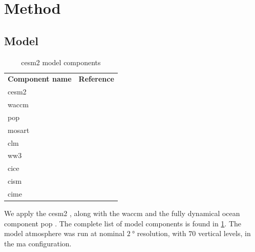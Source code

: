 \documentclass{ametsocV5}
\begin{document}
\section{Method}

\subsection{Model}

\begin{table}
  \centering

  \caption{\acl*{cesm2} model components}\label{tab:cesm-components}%
  \begin{center}
    \begin{tabular}[c]{ll}
      \multicolumn{1}{c}{\textbf{Component name}} &
      \multicolumn{1}{c}{\textbf{Reference}}                                              \\
      \acl*{cesm2}                                & \citet{danabasoglu2020}               \\
      \acl*{waccm}                                & \citet{gettleman2019}                 \\
      \acl*{pop}                                  & \citet{smith2010, danabasoglu2020}    \\
      \acl*{mosart}                               & \citet{li2013, danabasoglu2020}       \\
      \acl*{clm}                                  & \citet{lawrence2019, danabasoglu2020} \\
      \acl*{ww3}                                  & \citet{danabasoglu2020}               \\
      \acl*{cice}                                 & \citet{danabasoglu2020}               \\
      \acl*{cism}                                 & \citet{danabasoglu2020}               \\
      \acl*{cime}                                 & \citet{danabasoglu2020}
    \end{tabular}
  \end{center}
\end{table}

We apply the \ac{cesm2} \citep{danabasoglu2020}, along with the \ac{waccm}
\citep{gettleman2019} and the fully dynamical ocean component \ac{pop} \citep{smith2010,
  danabasoglu2020}. The complete list of model components is found in
\cref{tab:cesm-components}. The model atmosphere was run at nominal \(\SI{2}{\degree}\)
resolution, with \(70\) vertical levels, in the \ac{ma} configuration.
\end{document}
